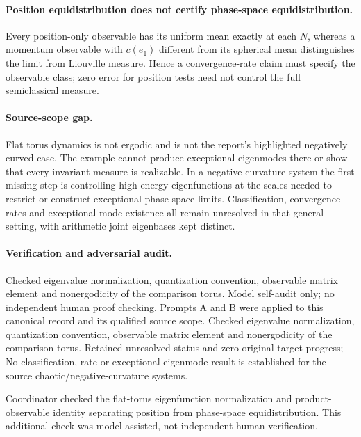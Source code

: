 \documentclass[11pt]{article}
\begin{document}
\paragraph{Position equidistribution does not certify phase-space equidistribution.} Every position-only observable has its uniform mean exactly at each $N$, whereas a momentum observable with $c(e_1)$ different from its spherical mean distinguishes the limit from Liouville measure. Hence a convergence-rate claim must specify the observable class; zero error for position tests need not control the full semiclassical measure.

\paragraph{Source-scope gap.} Flat torus dynamics is not ergodic and is not the report's highlighted negatively curved case. The example cannot produce exceptional eigenmodes there or show that every invariant measure is realizable. In a negative-curvature system the first missing step is controlling high-energy eigenfunctions at the scales needed to restrict or construct exceptional phase-space limits. Classification, convergence rates and exceptional-mode existence all remain unresolved in that general setting, with arithmetic joint eigenbases kept distinct.

\paragraph{Verification and adversarial audit.}
Checked eigenvalue normalization, quantization convention, observable matrix element and nonergodicity of the comparison torus. Model self-audit only; no independent human proof checking. Prompts A and B were applied to this canonical record and its qualified source scope. Checked eigenvalue normalization, quantization convention, observable matrix element and nonergodicity of the comparison torus. Retained unresolved status and zero original-target progress; No classification, rate or exceptional-eigenmode result is established for the source chaotic/negative-curvature systems.

Coordinator checked the flat-torus eigenfunction normalization and product-observable identity separating position from phase-space equidistribution. This additional check was model-assisted, not independent human verification.
\end{document}
